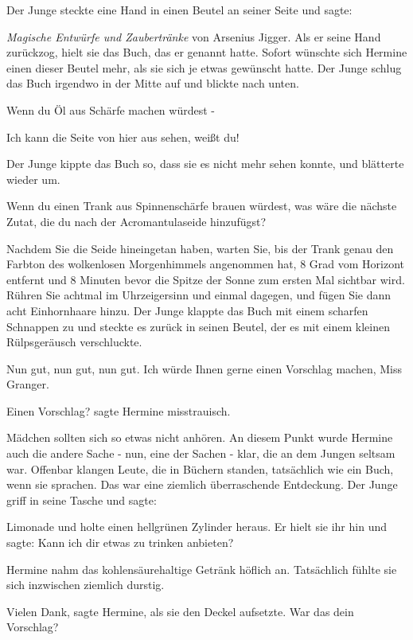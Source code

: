 Der Junge steckte eine Hand in einen Beutel an seiner Seite und sagte:

\emph{\glqq{}Magische Entwürfe und Zaubertränke} von Arsenius Jigger\grqq{}. Als
er seine Hand zurückzog, hielt sie das Buch, das er genannt hatte. Sofort
wünschte sich Hermine einen dieser Beutel mehr, als sie sich je etwas gewünscht
hatte. Der Junge schlug das Buch irgendwo in der Mitte auf und blickte nach
unten.

\glqq{}Wenn du Öl aus Schärfe machen würdest -\grqq{}

\glqq{}Ich kann die Seite von hier aus sehen, weißt du!\grqq{}

Der Junge kippte das Buch so, dass sie es nicht mehr sehen konnte, und blätterte
wieder um.

\glqq{}Wenn du einen Trank aus Spinnenschärfe brauen würdest, was wäre die
nächste Zutat, die du nach der Acromantulaseide hinzufügst?\grqq{}

\glqq{}Nachdem Sie die Seide hineingetan haben, warten Sie, bis der Trank genau
den Farbton des wolkenlosen Morgenhimmels angenommen hat, 8 Grad vom Horizont
entfernt und 8 Minuten bevor die Spitze der Sonne zum ersten Mal sichtbar wird.
Rühren Sie achtmal im Uhrzeigersinn und einmal dagegen, und fügen Sie dann acht
Einhornhaare hinzu.\grqq{} Der Junge klappte das Buch mit einem scharfen
Schnappen zu und steckte es zurück in seinen Beutel, der es mit einem kleinen
Rülpsgeräusch verschluckte.

\glqq{}Nun gut, nun gut, nun gut. Ich würde Ihnen gerne einen Vorschlag machen,
Miss Granger.\grqq{}

\glqq{}Einen Vorschlag?\grqq{} sagte Hermine misstrauisch.

Mädchen sollten sich so etwas nicht anhören. An diesem Punkt wurde Hermine auch
die andere Sache - nun, eine der Sachen - klar, die an dem Jungen seltsam war.
Offenbar klangen Leute, die in Büchern standen, tatsächlich wie ein Buch, wenn
sie sprachen. Das war eine ziemlich überraschende Entdeckung. Der Junge griff in
seine Tasche und sagte:

\glqq{}Limonade\grqq{} und holte einen hellgrünen Zylinder heraus. Er hielt sie
ihr hin und sagte: \glqq{}Kann ich dir etwas zu trinken anbieten?\grqq{}

Hermine nahm das kohlensäurehaltige Getränk höflich an. Tatsächlich fühlte sie
sich inzwischen ziemlich durstig.

\glqq{}Vielen Dank\grqq{}, sagte Hermine, als sie den Deckel aufsetzte. \glqq{}War
das dein Vorschlag?\grqq{}

